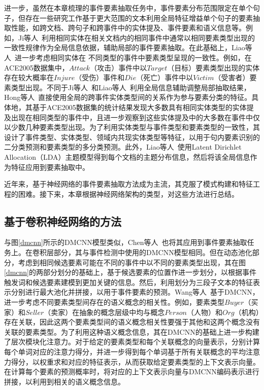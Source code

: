 进一步，虽然在本章梳理的事件要素抽取任务中，事件要素分布范围限定在单个句子，但存在一些研究工作基于更大范围的文本利用全局特征增益单个句子的要素抽取性能，如跨文档、跨句子和跨事件中的实体提及、事件要素和语义信息等。例如，Ji等人~\cite{ji2008refining}利用相同实体在相关文档内的相同事件中通常以相同要素类型出现的一致性规律作为全局信息依据，辅助局部的事件要素抽取。在此基础上，Liao等人~\cite{liao2010using}进一步考虑相同实体在
不同类型的事件中要素类型呈现的一致性。例如，在ACE2005数据集中，$Attack$（攻击）事件中以$Target$（目标）要素类型出现的实体存在较大概率在$Injure$（受伤）事件和$Die$（死亡）事件中以$Victim$（受害者）要素类型出现。不同于Ji等人~\cite{ji2008refining}和Liao等人~\cite{liao2010using}利用全局信息辅助调整局部抽取结果，Hong等人~\cite{hong2011using}直接使用全局的跨事件实体类型间的关系作为参与要素分类的特征。具体地，其基于ACE2005数据集的统计结果发现大多数具有相同实体类型的实体提及出现在相同类型的事件中，且进一步观察到这些实体提及中的大多数在事件中仅以少数几种要素类型出现。为了利用实体类型与事件类型和要素类型的一致性，其设计了事件类型、实体类型、领域内共现实体类型等特征，以用于句内要素识别的二分类预测和要素类型的多分类预测。此外，Liao等人~\cite{liao2011acquiring}使用Latent Dirichlet Allocation（LDA）\cite{blei2003latent}主题模型得到每个文档的主题分布信息，然后将该全局信息作为特征应用到要素抽取中。

近年来，基于神经网络的事件要素抽取方法成为主流，其克服了模式构建和特征工程的困难。接下来，本章根据神经网络架构的类型，对这些方法进行总结。

\subsection{基于卷积神经网络的方法}

与图\ref{dmcnn}所示的DMCNN模型类似，Chen等人~\cite{chen2015event}也将其应用到事件要素抽取任务上。在卷积层部分，其与事件检测中使用的DMCNN模型相同。但在动态池化部分，考虑到相同候选要素可能在不同的事件中以不同的要素类型出现，其在图\ref{dmcnn}的两部分划分的基础上，基于候选要素的位置作进一步划分，以根据事件触发词和候选要素建模到更加关键的信息。然后，利用划分为三段子文本的特征表示分别进行最大池化并拼接，以用于事件要素的预测。Wang等人~\cite{wang2019hmeae}基于DMCNN，进一步考虑不同要素类型间存在的语义概念的相关性。例如，要素类型$Buyer$（买家）和$Seller$（卖家）在抽象的概念层级中均与概念$Person$（人物）和$Org$（机构）存在关联，因此这两个要素类型间的语义概念相关性要强于其他和这两个概念没有关联的要素类型。为了利用这种语义概念信息，其在DMCNN的基础上进一步构建了层次模块化注意力。对于给定的要素类型和每个关联概念的向量表示，分别计算每个单词对应的注意力得分，并进一步得到每个单词基于所有关联概念的平均注意力得分，以权重求和对应的特征表示，从而获取给定要素类型的上下文表示向量。在计算每个要素的预测概率时，将对应的上下文表示向量与DMCNN编码表示进行拼接，以利用到相关的语义概念信息。

